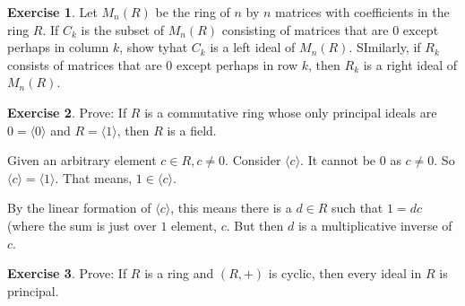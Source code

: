 \documentclass[11pt,oneside]{article}
\numberwithin{equation}{section}
\theoremstyle{definition}
\newtheorem{exercise}{Exercise}
\begin{document}
\begin{exercise}
  Let $M_n(R)$ be the ring of $n$ by $n$ matrices with coefficients
  in the ring $R$. If $C_k$ is the subset of $M_n(R)$ consisting of
  matrices that are $0$ except perhaps in column $k$, show tyhat
  $C_k$ is a left ideal of $M_n(R)$.  SImilarly, if $R_k$ consists
  of matrices that are $0$ except perhaps in row $k$, then $R_k$ is a
  right ideal of $M_n(R)$.  
\end{exercise}
\begin{solution}
\end{solution}
\begin{exercise}
  Prove: If $R$ is a commutative ring whose only principal ideals
  are ${0} = \langle 0 \rangle$ and $ R = \langle 1 \rangle$, then
  $R$ is a field.
\end{exercise}
\begin{solution}
  Given an arbitrary element $c \in R, c \neq 0$.
  Consider $\langle c \rangle$.  It cannot be ${0}$ as $c \neq 0$.
  So $\langle c \rangle = \langle 1 \rangle $.
  That means, $ 1 \in \langle c \rangle$.

  By the linear formation of $\langle c \rangle$, this means there is
  a $d \in R$ such that $1 = d c$ (where the sum is just over $1$
  element, $c$.  But then $d$ is a multiplicative inverse of $c$.  
  
  
\end{solution}
\begin{exercise}
  Prove: If $R$ is a ring and $(R, +)$ is cyclic, then every ideal in $R$ is principal.  
\end{exercise}
\end{document}
